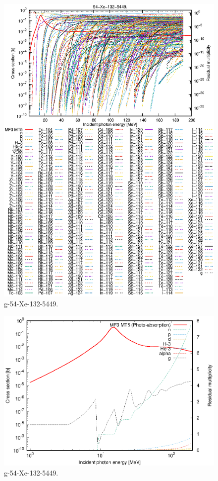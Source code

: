 \begin{figure}
 \includegraphics[width=\linewidth]{eps/g_54-Xe-132_5449.eps}
  \caption{g-54-Xe-132-5449.}
\end{figure}
\newpage \clearpage

\begin{figure}
 \includegraphics[width=\linewidth]{eps-log/g_54-Xe-132_5449.eps}
 \caption{g-54-Xe-132-5449.}
\end{figure}
\newpage \clearpage

